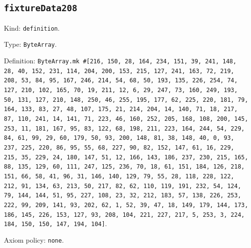 \documentclass[11pt]{article}
\begin{document}
\subsection*{\texttt{fixtureData208}}
\noindent Kind: \texttt{definition}.\par
\noindent Type: \texttt{ByteArray}.\par
\noindent Definition: \texttt{ByteArray.mk \#[216, 150, 28, 164, 234, 151, 39, 241, 148, 28, 40, 152, 231, 114, 204, 200, 153, 215, 127, 241, 163, 72, 219, 208, 53, 84, 95, 167, 246, 214, 54, 68, 50, 193, 135, 226, 254, 74, 127, 210, 102, 165, 70, 19, 211, 12, 6, 29, 247, 73, 160, 249, 193, 50, 131, 127, 210, 148, 250, 46, 255, 195, 177, 62, 225, 220, 181, 79, 164, 133, 83, 27, 48, 107, 175, 21, 214, 204, 14, 140, 71, 18, 217, 87, 110, 241, 14, 141, 71, 223, 46, 160, 252, 205, 168, 108, 200, 145, 253, 11, 181, 167, 95, 83, 122, 68, 198, 211, 223, 164, 244, 54, 229, 84, 61, 99, 29, 60, 179, 50, 93, 200, 148, 81, 38, 148, 40, 0, 93, 237, 225, 220, 86, 95, 55, 68, 227, 90, 82, 152, 147, 61, 16, 229, 215, 35, 229, 24, 180, 147, 51, 12, 166, 143, 186, 237, 230, 215, 165, 88, 135, 129, 60, 111, 247, 125, 236, 70, 18, 61, 151, 184, 126, 218, 151, 66, 58, 41, 96, 31, 146, 140, 129, 79, 55, 28, 118, 228, 122, 212, 91, 134, 63, 213, 50, 217, 82, 62, 110, 119, 191, 232, 54, 124, 79, 144, 144, 51, 95, 227, 108, 23, 32, 212, 183, 57, 138, 226, 253, 222, 99, 209, 141, 93, 202, 62, 1, 52, 39, 47, 18, 149, 179, 144, 173, 186, 145, 226, 153, 127, 93, 208, 104, 221, 227, 217, 5, 253, 3, 224, 184, 150, 150, 147, 194, 104]}.\par
\noindent Axiom policy: \texttt{none}.\par
\end{document}
